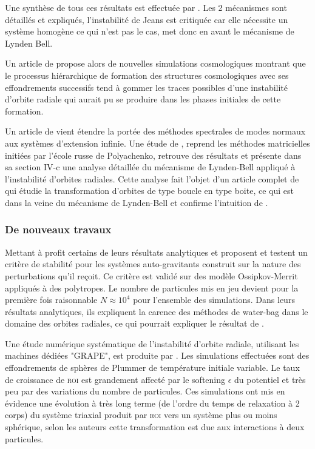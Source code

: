 Une synthèse de tous ces résultats est effectuée par \cite{merritt1987}. Les 2 mécanismes sont détaillés et expliqués, l'instabilité de Jeans est
critiquée car elle nécessite un système homogène ce qui n'est pas le cas, \cite{merritt1987} met donc en avant le mécanisme de Lynden Bell.

Un article de \cite{katz} propose alors de nouvelles simulations cosmologiques montrant que le processus hiérarchique de
formation des structures cosmologiques avec ses effondrements successifs tend à gommer les traces possibles d'une instabilité d'orbite radiale qui
aurait pu se produire dans les phases initiales de cette formation.

Un article de \cite{saha} vient étendre la portée des méthodes spectrales de modes normaux aux systèmes d'extension
infinie. %
Une étude de \cite{weinberg}, reprend les méthodes matricielles initiées par l'école russe de Polyachenko, retrouve des résultats et présente dans sa
section IV-c une analyse détaillée du mécanisme de Lynden-Bell appliqué à l'instabilité d'orbites radiales. Cette analyse fait l'objet d'un
article complet de \cite{cincotta} qui étudie la transformation d'orbites de type boucle en type boite, ce qui est dans la veine du mécanisme de
Lynden-Bell et confirme l'intuition de \cite{merritt1987}.

\subsubsection{De nouveaux travaux}


Mettant à profit certains de leurs résultats analytiques \cite{JPerez96} et \cite{perez_et_al} proposent et testent un critère de stabilité
pour les systèmes auto-gravitants construit sur la nature des perturbations qu'il reçoit. Ce critère est validé sur des modèle Ossipkov-Merrit
appliqués à des polytropes. Le nombre de particules mis en jeu devient pour la première fois raisonnable $N\approx10^{4}$ pour l'ensemble des
simulations. Dans leurs résultats analytiques, ils expliquent la carence des méthodes de water-bag dans le domaine des orbites radiales, ce qui
pourrait expliquer le résultat de \cite{waterbag}.

Une étude numérique systématique de l'instabilité d'orbite radiale, utilisant les machines dédiées "GRAPE", est produite par \cite{theis}. Les
simulations effectuées sont des effondrements de sphères de Plummer de température initiale variable. Le taux de croissance de \textsc{roi} est
grandement affecté par le softening $\epsilon$ du potentiel et très peu par des variations du nombre de particules. Ces simulations ont mis en
évidence une évolution à très long terme (de l'ordre du temps de relaxation à 2 corps) du système triaxial produit par \textsc{roi} vers un système
plus ou moins sphérique, selon les auteurs cette transformation est due aux interactions à deux particules.

